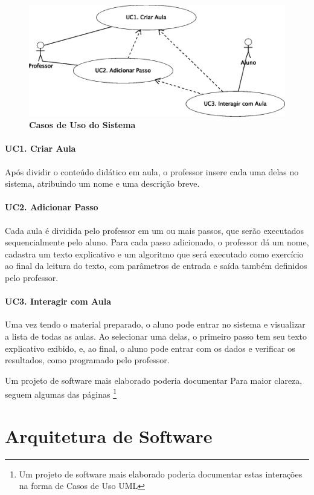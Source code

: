 \documentclass{abnt}
\begin{document}
\begin{figure}[htbp]
\begin{center}
\includegraphics[scale=0.75]{casos.eps}
\caption{{\bf Casos de Uso do Sistema}}
\label{casos}
\end{center}
\end{figure}

\subsubsection{UC1. Criar Aula}
Após dividir o conteúdo didático em aula, o professor insere cada uma delas no sistema, atribuindo um nome e uma descrição breve.
\subsubsection{UC2. Adicionar Passo}
Cada aula é dividida pelo professor em um ou mais passos, que serão executados sequencialmente pelo aluno. Para cada passo adicionado, o professor dá um nome, cadastra um texto explicativo e um algoritmo que será executado como exercício ao final da leitura do texto, com parâmetros de entrada e saída também definidos pelo professor.
\subsubsection{UC3. Interagir com Aula}
Uma vez tendo o material preparado, o aluno pode entrar no sistema e visualizar a lista de todas as aulas. Ao selecionar uma delas, o primeiro passo tem seu texto explicativo exibido, e, ao final, o aluno pode entrar com os dados e verificar os resultados, como programado pelo professor.


Um projeto de software mais elaborado poderia documentar 
Para maior clareza, seguem algumas das páginas \footnote{Um projeto de software mais elaborado poderia documentar estas interações na forma de Casos de Uso UML\cite{}}

\chapter {Arquitetura de Software}
\end{document}
